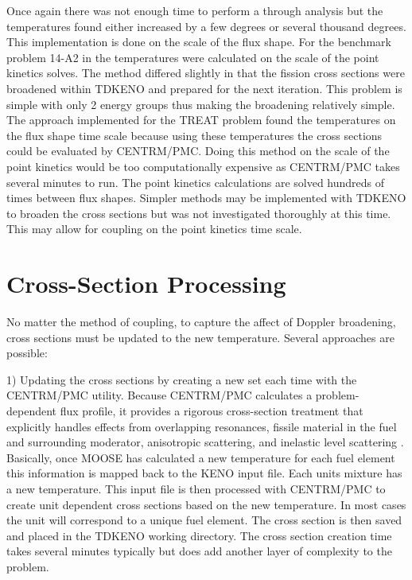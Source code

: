 \documentclass[11pt]{article}
\begin{document}
Once again there was not enough time to perform a through analysis but the temperatures found either increased by a few degrees or several thousand degrees.  This implementation is done on the scale of the flux shape.  For the benchmark problem 14-A2 in \cite{Bentley} the temperatures were calculated on the scale of the point kinetics solves.  The method differed slightly in that the fission cross sections were broadened within TDKENO and prepared for the next iteration.  This problem is simple with only 2 energy groups thus making the broadening relatively simple.  The approach implemented for the TREAT problem found the temperatures on the flux shape time scale because using these  temperatures the cross sections could be evaluated by CENTRM/PMC.  Doing this method on the scale of the point kinetics would be too computationally expensive as CENTRM/PMC takes several minutes to run. The point kinetics calculations are solved hundreds of times between flux shapes.  Simpler methods may be implemented with TDKENO to broaden the cross sections but was not investigated thoroughly at this time.  This may allow for coupling on the point kinetics time scale.   

\section{Cross-Section Processing}
No matter the method of coupling, to capture the affect of Doppler broadening,  cross sections must be updated to the new temperature. Several approaches are possible:

1)	Updating the cross sections by creating a new set each time with the CENTRM/PMC utility. Because CENTRM/PMC calculates a problem-dependent flux profile, it provides a rigorous cross-section treatment that explicitly handles effects from overlapping resonances, fissile material in the fuel and surrounding moderator, anisotropic scattering, and inelastic level scattering \cite{bowman2007overview}.  Basically, once MOOSE has calculated a new temperature for each fuel element this information is mapped back to the KENO input file.  Each units mixture has a new temperature.  This input file is then processed with CENTRM/PMC to create unit dependent cross sections  based on the new temperature.  In most cases the unit will correspond to a unique fuel element. The cross section is then saved and placed in the TDKENO working directory.  The cross section creation time takes several minutes typically but does add another layer of complexity to the problem.  
\end{document}

